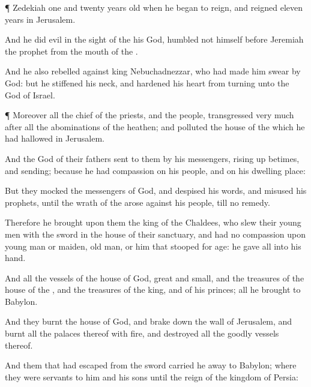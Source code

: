 {\par }{\PP {}¶
Zedekiah
{}
one and
twenty
years
old when he began to
reign, and
reigned
eleven
years in
Jerusalem.

And he
did
{}
evil in the
sight of the
{} his
God,
{}
humbled not himself
before
Jeremiah the
prophet
{} from the
mouth of the
{}.

And he also
rebelled against
king
Nebuchadnezzar, who had made him
swear by
God: but he
stiffened his
neck, and
hardened his
heart from
turning unto the
{}
God of
Israel.


\par }{\PP {}¶ Moreover all the
chief of the
priests, and the
people,
transgressed
very
much after all the
abominations of the
heathen; and
polluted the
house of the
{} which he had
hallowed in
Jerusalem.

And the
{}
God of their
fathers
sent to them
by his
messengers, rising up
betimes, and
sending; because he had
compassion on his
people, and on his dwelling
place:

But they
mocked the
messengers of
God, and
despised his
words, and
misused his
prophets, until the
wrath of the
{}
arose against his
people, till
{} no
remedy.

Therefore he
brought upon them the
king of the
Chaldees, who
slew their young
men with the
sword in the
house of their
sanctuary, and had no
compassion upon young
man or
maiden, old
man, or him that stooped for
age: he
gave
{} all into his
hand.

And all the
vessels of the
house of
God,
great and
small, and the
treasures of the
house of the
{}, and the
treasures of the
king, and of his
princes; all
{} he
brought to
Babylon.

And they
burnt the
house of
God, and brake
down the
wall of
Jerusalem, and
burnt all the
palaces thereof with
fire, and
destroyed all the
goodly
vessels thereof.

And them that had
escaped from the
sword carried he
away to
Babylon; where they were
servants to him and his
sons until the
reign of the
kingdom of
Persia:

}

